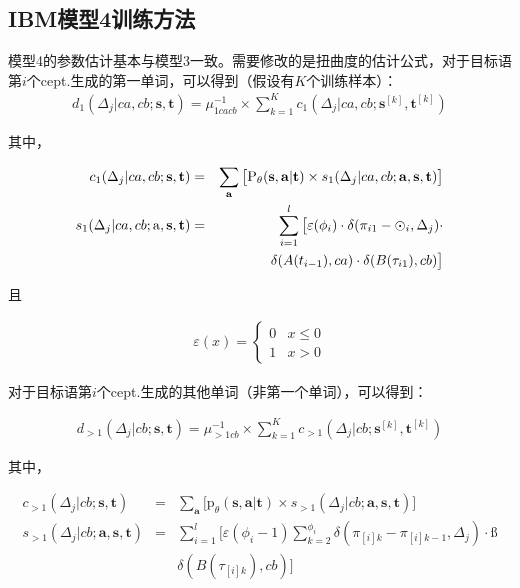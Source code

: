 \begin{appendices}
\section{IBM模型4训练方法}

\parinterval 模型4的参数估计基本与模型3一致。需要修改的是扭曲度的估计公式，对于目标语第$i$个cept.生成的第一单词，可以得到（假设有$K$个训练样本）：
\begin{eqnarray}
d_1(\Delta_j|ca,cb;\mathbf{s},\mathbf{t}) = \mu_{1cacb}^{-1} \times \sum_{k=1}^{K}c_1(\Delta_j|ca,cb;\mathbf{s}^{[k]},\mathbf{t}^{[k]})
\label{eq:1.15}
\end{eqnarray}

其中，

\begin{eqnarray}
c_1(\Delta_j|ca,cb;\mathbf{s},\mathbf{t})           & = & \sum_{\mathbf{a}}\big[\textrm{P}_{\theta}(\mathbf{s},\mathbf{a}|\mathbf{t}) \times s_1(\Delta_j|ca,cb;\mathbf{a},\mathbf{s},\mathbf{t})\big] \label{eq:1.16} \\
s_1(\Delta_j|ca,cb;\rm{a},\mathbf{s},\mathbf{t}) & = & \sum_{i=1}^l \big[\varepsilon(\phi_i) \cdot \delta(\pi_{i1}-\odot _{i},\Delta_j) \cdot \nonumber \\
                                                                           &     & \delta(A(t_{i-1}),ca) \cdot \delta(B(\tau_{i1}),cb) \big] \label{eq:1.17}
\end{eqnarray}

且

\begin{eqnarray}
\varepsilon(x) = \begin{cases}
0 & x \leq 0 \\
1 & x > 0
\end{cases}
\label{eq:1.21}
\end{eqnarray}

对于目标语第$i$个cept.生成的其他单词（非第一个单词），可以得到：

\begin{eqnarray}
d_{>1}(\Delta_j|cb;\mathbf{s},\mathbf{t}) = \mu_{>1cb}^{-1} \times \sum_{k=1}^{K}c_{>1}(\Delta_j|cb;\mathbf{s}^{[k]},\mathbf{t}^{[k]})
\label{eq:1.18}
\end{eqnarray}

其中，

\begin{eqnarray}
c_{>1}(\Delta_j|cb;\mathbf{s},\mathbf{t})                  & = & \sum_{\mathbf{a}}\big[\textrm{p}_{\theta}(\mathbf{s},\mathbf{a}|\mathbf{t}) \times s_{>1}(\Delta_j|cb;\mathbf{a},\mathbf{s},\mathbf{t}) \big] \label{eq:1.19} \\
s_{>1}(\Delta_j|cb;\mathbf{a},\mathbf{s},\mathbf{t}) & = & \sum_{i=1}^l \big[\varepsilon(\phi_i-1)\sum_{k=2}^{\phi_i}\delta(\pi_{[i]k}-\pi_{[i]k-1},\Delta_j) \cdot \nonumber ß\\
                                                                                  &    & \delta(B(\tau_{[i]k}),cb) \big] \label{eq:1.20}
\end{eqnarray}


\end{appendices}
